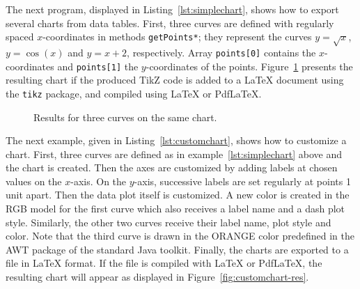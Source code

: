 \begin{latexonly}




The next program, displayed in Listing~\ref{lst:simplechart},
shows how to export several charts from data tables.
First, three curves are defined with regularly spaced $x$-coordinates
in methods \texttt{getPoints*}; they represent the curves $y = \sqrt x$,
$y = \cos(x)$ and $y = x+2$, respectively. Array \texttt{points[0]} contains
the $x$-coordinates and \texttt{points[1]} the $y$-coordinates
of the points.
Figure~\ref{fig:simplechart-res} presents the resulting chart if the produced
TikZ code is added to a \LaTeX{} document using the \texttt{tikz}
package, and compiled using \LaTeX{}  or Pdf\LaTeX.





\begin{figure}

\caption{Results for three curves on the same chart.\label{fig:simplechart-res}}
\end{figure}




The next example, given in Listing~\ref{lst:customchart},
 shows how to customize a chart. First, three curves are defined as
in example~\ref{lst:simplechart} above and the chart is created. Then the
axes are customized by adding labels at chosen values on the $x$-axis.
On the $y$-axis, successive labels are set regularly at points 1 unit apart.
Then the data plot itself is customized. A new color is created in the RGB
model for the first curve which also receives a label name and a dash plot style.
Similarly, the other two curves receive their label name, plot style
 and color. Note that the third curve is drawn in the ORANGE color predefined
 in the AWT package of the standard Java toolkit.
Finally, the charts are exported to a file in \LaTeX{}
format. If the file is compiled with \LaTeX{} or Pdf\LaTeX, the
resulting chart will appear as  displayed in Figure~\ref{fig:customchart-res}.






\end{latexonly}
